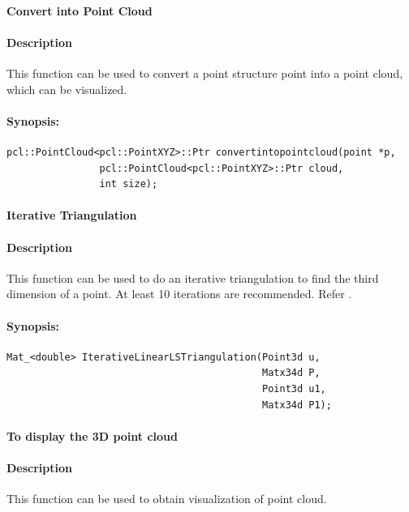 \paragraph{ Convert into Point Cloud }
\paragraph{Description}
This function can be used to convert a point structure point into a point cloud, which can be visualized.
\paragraph{Synopsis:}
\begin{lstlisting}
pcl::PointCloud<pcl::PointXYZ>::Ptr convertintopointcloud(point *p, 
				pcl::PointCloud<pcl::PointXYZ>::Ptr cloud,
				int size);
\end{lstlisting}


\paragraph{ Iterative Triangulation }
\paragraph{Description}
This function can be used to do an iterative triangulation to find the third dimension of a point. At least 10 iterations are recommended. Refer \cite{hartley2003multiple, hartley1995linear}. 

\paragraph{Synopsis:}
\begin{lstlisting}
Mat_<double> IterativeLinearLSTriangulation(Point3d u,  
                                            Matx34d P,          
                                            Point3d u1,        
                                            Matx34d P1);
\end{lstlisting}


\paragraph{  To display the 3D point cloud }
\paragraph{Description}
This function can be used to obtain visualization of point cloud.
